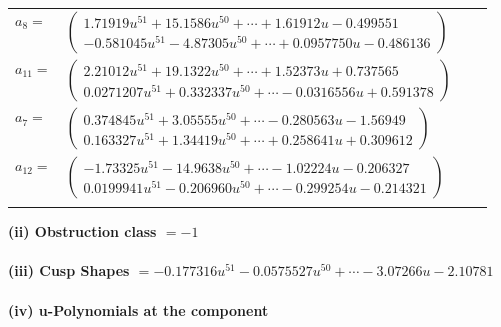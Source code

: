 \documentclass[1p]{elsarticle_modified}
\theoremstyle{definition}
\begin{document}
\begin{tabular}{m{7pt} m{180pt} m{7pt} m{180pt} }
\flushright $a_{8}=$&$\begin{pmatrix}1.71919 u^{51}+15.1586 u^{50}+\cdots+1.61912 u-0.499551\\-0.581045 u^{51}-4.87305 u^{50}+\cdots+0.0957750 u-0.486136\end{pmatrix}$ \\
\flushright $a_{11}=$&$\begin{pmatrix}2.21012 u^{51}+19.1322 u^{50}+\cdots+1.52373 u+0.737565\\0.0271207 u^{51}+0.332337 u^{50}+\cdots-0.0316556 u+0.591378\end{pmatrix}$ \\
\flushright $a_{7}=$&$\begin{pmatrix}0.374845 u^{51}+3.05555 u^{50}+\cdots-0.280563 u-1.56949\\0.163327 u^{51}+1.34419 u^{50}+\cdots+0.258641 u+0.309612\end{pmatrix}$ \\
\flushright $a_{12}=$&$\begin{pmatrix}-1.73325 u^{51}-14.9638 u^{50}+\cdots-1.02224 u-0.206327\\0.0199941 u^{51}-0.206960 u^{50}+\cdots-0.299254 u-0.214321\end{pmatrix}$\\&\end{tabular}
\flushleft \textbf{(ii) Obstruction class $= -1$}\\~\\
\flushleft \textbf{(iii) Cusp Shapes $= -0.177316 u^{51}-0.0575527 u^{50}+\cdots-3.07266 u-2.10781$}\\~\\
\newpage\renewcommand{\arraystretch}{1}
\flushleft \textbf{(iv) u-Polynomials at the component}\newline \\
\end{document}
